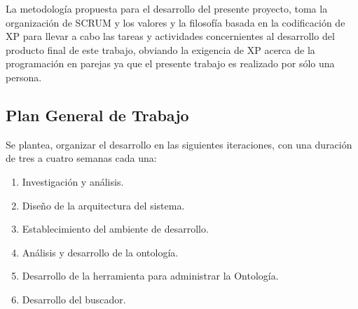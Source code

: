 La metodología propuesta para el desarrollo del presente proyecto, toma la organización de SCRUM y los valores y la filosofía basada en la codificación de XP para llevar a cabo las tareas y actividades concernientes al desarrollo del producto final de este trabajo, obviando la exigencia de XP acerca de la programación en parejas ya que el presente trabajo es realizado por sólo una persona.

\subsection{Plan General de Trabajo}
Se plantea, organizar el desarrollo en las siguientes iteraciones, con una duración de tres a cuatro semanas cada una:

\begin{enumerate}
\item Investigación y análisis.
\item Diseño de la arquitectura del sistema.
\item Establecimiento del ambiente de desarrollo.
\item Análisis y desarrollo de la ontología.
\item Desarrollo de la herramienta para administrar la Ontología.
\item Desarrollo del buscador.
\end{enumerate}

\newpage

